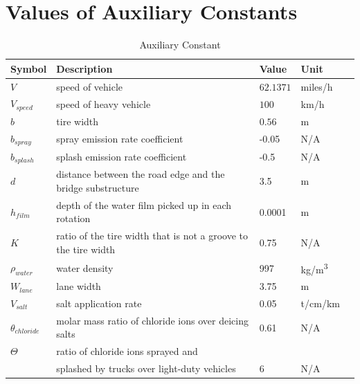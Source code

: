 \documentclass[12pt]{article}
\begin{document}
\newpage
\section{Values of Auxiliary Constants}

\begin{table}[!h]

  \renewcommand{\arraystretch}{1.2}
\noindent \begin{longtable*}{l l l l c} 
  \toprule
 \textbf{Symbol} & \textbf{Description} & \textbf{Value} & \textbf{Unit}\\


  \midrule 
  $V$ &  speed of vehicle & $62.1371$ & miles/h   \\
  $V_{speed}$ & speed of heavy vehicle & $100$ & km/h   \\
  $b$ & tire width & $0.56$ & m \\
  
  $b_{spray}$ & spray emission rate coefficient & -0.05 & N/A
  \\
  $b_{splash}$ & splash emission rate coefficient & -0.5 & N/A
  \\
  $d$ & distance between the road edge and the bridge substructure & 3.5 & m
  \\
  $h_{film}$ & depth of the water film picked up in each rotation & 0.0001 & m
  \\
  $K$ & ratio of the tire width that is not a groove to the tire width & 0.75& N/A
  \\
  $\rho_{water}$ & water density & 997 & \si{kg/m^3}
  \\  
  $W_{lane}$ & lane width & 3.75 & m
  \\  
  $V_{salt}$ & salt application rate & 0.05 & t/cm/km
  \\
  $\theta_{chloride}$ &  molar mass ratio of chloride ions over deicing salts & 0.61 & N/A \\
  $\Theta$ & ratio of chloride ions sprayed and  \\
  & splashed by trucks over light-duty vehicles& 6 & N/A  \\  
  
  \bottomrule
\end{longtable*}
  \caption{Auxiliary Constant} \label{TblConstants}
\end{table}


\newpage
\end{document}
